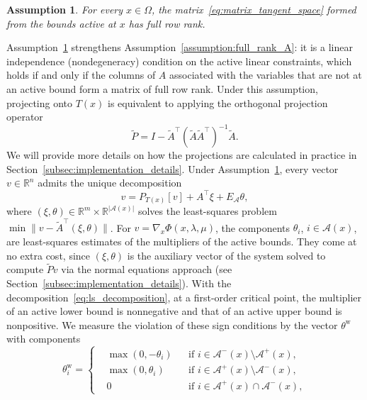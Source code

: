 \documentclass{article}
\numberwithin{equation}{section}
\newcommand{\RR}{{\mathbb{R}}} %
\newcommand{\calA}{{\mathcal{A}}}
\newcommand{\proj}[2]{P_{#1} \left[ {#2} \right]} %
\theoremstyle{plain}
\newtheorem{assumption}{Assumption}
\begin{document}
\begin{assumption}\label{assumption:full_rank_active}
	For every $x \in \Omega$, the matrix~\eqref{eq:matrix_tangent_space} formed from the bounds active at $x$ has full row rank.
\end{assumption}
Assumption~\ref{assumption:full_rank_active} strengthens Assumption~\ref{assumption:full_rank_A}: it is a linear independence (nondegeneracy) condition on the active linear constraints, which holds if and only if the columns of $A$ associated with the variables that are not at an active bound form a matrix of full row rank. Under this assumption, projecting onto $T(x)$ is equivalent to applying the orthogonal projection operator
\begin{equation}\label{eq:minor_subpb_projector}
	\tilde{P} = I - \tilde{A}^\top\left(\tilde{A}\tilde{A}^\top\right)^{-1}\tilde{A}.
\end{equation}
We will provide more details on how the projections are calculated in practice in Section~\ref{subsec:implementation_details}. Under Assumption~\ref{assumption:full_rank_active}, every vector $v \in \RR^n$ admits the unique decomposition
\begin{equation}\label{eq:ls_decomposition}
	v = \proj{T(x)}{v} + A^\top \xi + E_\calA \theta,
\end{equation}
where $(\xi,\theta) \in \RR^m \times \RR^{|\calA(x)|}$ solves the least-squares problem $\min \|v - \tilde{A}^\top (\xi,\theta)\|$. For $v = \nabla_x\Phi(x,\lambda,\mu)$, the components $\theta_i$, $i \in \calA(x)$, are least-squares estimates of the multipliers of the active bounds. They come at no extra cost, since $(\xi,\theta)$ is the auxiliary vector of the system solved to compute $\tilde{P}v$ via the normal equations approach (see Section~\ref{subsec:implementation_details}). With the decomposition~\eqref{eq:ls_decomposition}, at a first-order critical point, the multiplier of an active lower bound is nonnegative and that of an active upper bound is nonpositive. We measure the violation of these sign conditions by the vector $\theta^{\mathrm{w}}$ with components
\begin{equation*}
	\theta^{\mathrm{w}}_i = \left\{\begin{aligned}
		& \max(0,-\theta_i) & & \text{if } i \in \calA^-(x) \setminus \calA^+(x), \\
		& \max(0,\theta_i) & & \text{if } i \in \calA^+(x) \setminus \calA^-(x), \\
		& 0 & & \text{if } i \in \calA^+(x) \cap \calA^-(x),
	\end{aligned}\right.
\end{equation*}
\end{document}
